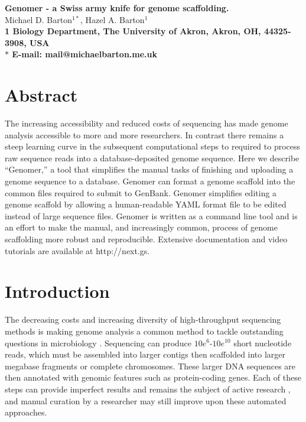 \documentclass[10pt]{article}
\date{}
\begin{document}
\begin{flushleft}
{\Large
\textbf{Genomer - a Swiss army knife for genome scaffolding.}
}
\\
Michael D. Barton$^{1\ast}$, 
Hazel A. Barton$^{1}$
\\
\bf{1} Biology Department, The University of Akron, Akron, OH, 44325-3908, USA
\\
$\ast$ E-mail: mail@michaelbarton.me.uk
\end{flushleft}

\section*{Abstract}

The increasing accessibility and reduced costs of sequencing has made genome
analysis accessible to more and more researchers. In contrast there remains a
steep learning curve in the subsequent computational steps to required to
process raw sequence reads into a database-deposited genome sequence. Here we
describe ``Genomer,'' a tool that simplifies the manual tasks of finishing and
uploading a genome sequence to a database. Genomer can format a genome scaffold
into the common files required to submit to GenBank. Genomer simplifies editing
a genome scaffold by allowing a human-readable YAML format file to be edited
instead of large sequence files. Genomer is written as a command line tool and
is an effort to make the manual, and increasingly common, process of genome
scaffolding more robust and reproducible. Extensive documentation and video
tutorials are available at http://next.gs.

\section*{Introduction}

The decreasing costs and increasing diversity of high-throughput sequencing
methods is making genome analysis a common method to tackle outstanding
questions in microbiology \cite{loman2012b}. Sequencing can produce
$10e^{6}$-$10e^{10}$ short nucleotide reads, which must be assembled into
larger contigs then scaffolded into larger megabase fragments or complete
chromosomes. These larger DNA sequences are then annotated with genomic
features such as protein-coding genes. Each of these steps can provide
imperfect results and remains the subject of active research
\cite{earl2011,quail2012,beckloff2012}, and manual curation by a researcher may
still improve upon these automated approaches.
\end{document}
